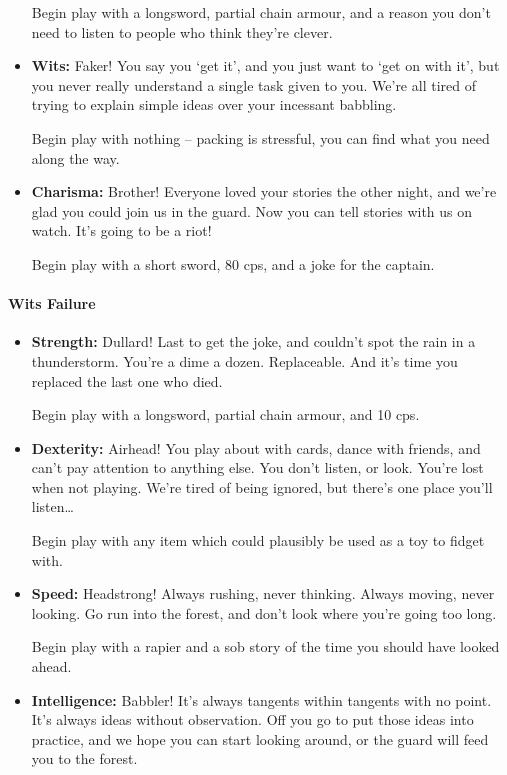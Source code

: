 \begin{multicols}{2}
\begin{itemize}
  Begin play with a longsword, partial chain armour, and a reason you don't need to listen to people who think they're clever.

  \item
  \textbf{Wits:}
  Faker!
  You say you `get it', and you just want to `get on with it', but you never really understand a single task given to you.
  We're all tired of trying to explain simple ideas over your incessant babbling.

  Begin play with nothing -- packing is stressful, you can find what you need along the way.
  \item
  \textbf{Charisma:}
  Brother!
  Everyone loved your stories the other night, and we're glad you could join us in the \gls{guard}.
  Now you can tell stories with us on watch.
  It's going to be a riot!

  Begin play with a short sword, 80 \glspl{cp}, and a joke for the captain.

\end{itemize}

\paragraph{Wits Failure}
\begin{itemize}

  \item
  \textbf{Strength:}
  Dullard!
  Last to get the joke, and couldn't spot the rain in a thunderstorm.
  You're a dime a dozen.
  Replaceable.
  And it's time you replaced the last one who died.

  Begin play with a longsword, partial chain armour, and 10 \glspl{cp}.
  \item
  \textbf{Dexterity:}
  Airhead!
  You play about with cards, dance with friends, and can't pay attention to anything else.
  You don't listen, or look.
  You're lost when not playing.
  We're tired of being ignored, but there's one place you'll listen\ldots

  Begin play with any item which could plausibly be used as a toy to fidget with.
  \item
  \textbf{Speed:}
  Headstrong!
  Always rushing, never thinking.
  Always moving, never looking.
  Go run into the forest, and don't look where you're going too long.

  Begin play with a rapier and a sob story of the time you should have looked ahead.
  \item
  \textbf{Intelligence:}
  Babbler!
  It's always tangents within tangents with no point.
  It's always ideas without observation.
  Off you go to put those ideas into practice, and we hope you can start looking around, or the \gls{guard} will feed you to the forest.


\end{itemize}
\end{multicols}

